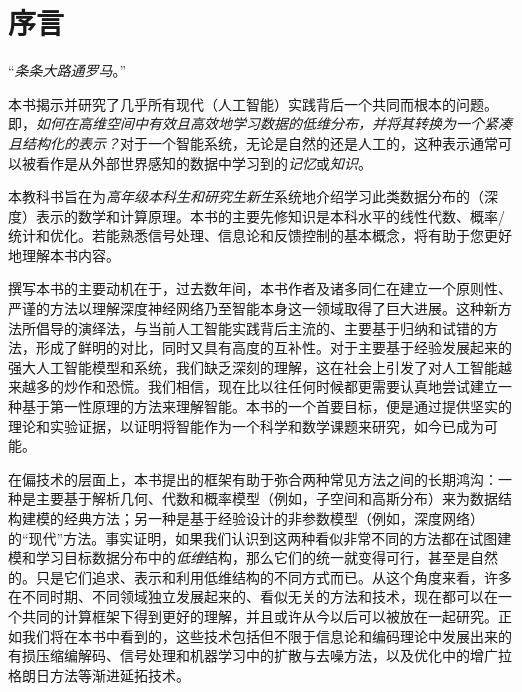 \documentclass[../../book-main.tex]{subfiles}
\begin{document}
\chapter*{序言}

\begin{center}
``{\em 条条大路通罗马}。''

\end{center}
\vspace{5mm}

本书揭示并研究了几乎所有现代（人工智能）实践背后一个共同而根本的问题。即，{\em 如何在高维空间中有效且高效地学习数据的低维分布，并将其转换为一个紧凑且结构化的表示？}对于一个智能系统，无论是自然的还是人工的，这种表示通常可以被看作是从外部世界感知的数据中学习到的{\em 记忆}或{\em 知识}。

本教科书旨在为{\em 高年级本科生和研究生新生}系统地介绍学习此类数据分布的（深度）表示的数学和计算原理。本书的主要先修知识是本科水平的线性代数、概率/统计和优化。若能熟悉信号处理、信息论和反馈控制的基本概念，将有助于您更好地理解本书内容。

撰写本书的主要动机在于，过去数年间，本书作者及诸多同仁在建立一个原则性、严谨的方法以理解深度神经网络乃至智能本身这一领域取得了巨大进展。这种新方法所倡导的演绎法，与当前人工智能实践背后主流的、主要基于归纳和试错的方法，形成了鲜明的对比，同时又具有高度的互补性。对于主要基于经验发展起来的强大人工智能模型和系统，我们缺乏深刻的理解，这在社会上引发了对人工智能越来越多的炒作和恐慌。我们相信，现在比以往任何时候都更需要认真地尝试建立一种基于第一性原理的方法来理解智能。本书的一个首要目标，便是通过提供坚实的理论和实验证据，以证明将智能作为一个科学和数学课题来研究，如今已成为可能。

在偏技术的层面上，本书提出的框架有助于弥合两种常见方法之间的长期鸿沟：一种是主要基于解析几何、代数和概率模型（例如，子空间和高斯分布）来为数据结构建模的经典方法；另一种是基于经验设计的非参数模型（例如，深度网络）的“现代”方法。事实证明，如果我们认识到这两种看似非常不同的方法都在试图建模和学习目标数据分布中的{\em 低维}结构，那么它们的统一就变得可行，甚至是自然的。只是它们追求、表示和利用低维结构的不同方式而已。从这个角度来看，许多在不同时期、不同领域独立发展起来的、看似无关的方法和技术，现在都可以在一个共同的计算框架下得到更好的理解，并且或许从今以后可以被放在一起研究。正如我们将在本书中看到的，这些技术包括但不限于信息论和编码理论中发展出来的有损压缩编解码、信号处理和机器学习中的扩散与去噪方法，以及优化中的增广拉格朗日方法等渐进延拓技术。
\end{document}
